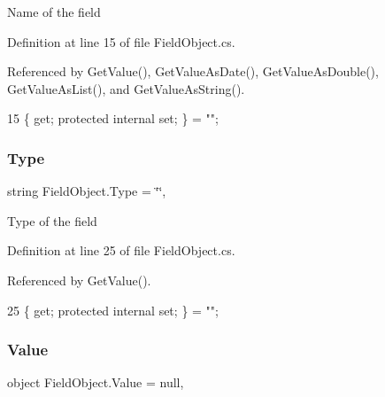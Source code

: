 Name of the field 



Definition at line 15 of file Field\+Object.\+cs.



Referenced by Get\+Value(), Get\+Value\+As\+Date(), Get\+Value\+As\+Double(), Get\+Value\+As\+List(), and Get\+Value\+As\+String().


\begin{DoxyCode}
15 \{ \textcolor{keyword}{get}; \textcolor{keyword}{protected} \textcolor{keyword}{internal} \textcolor{keyword}{set}; \} = \textcolor{stringliteral}{""};
\end{DoxyCode}
\mbox{\label{class_field_object_a370af2c26ae9c3e713b5d88b62a2a8f9}} 
\subsubsection{\texorpdfstring{Type}{Type}}
{\footnotesize\ttfamily string Field\+Object.\+Type = \char`\"{}\char`\"{}\hspace{0.3cm}{\ttfamily [get]}, {\ttfamily [set]}}



Type of the field 



Definition at line 25 of file Field\+Object.\+cs.



Referenced by Get\+Value().


\begin{DoxyCode}
25 \{ \textcolor{keyword}{get}; \textcolor{keyword}{protected} \textcolor{keyword}{internal} \textcolor{keyword}{set}; \} = \textcolor{stringliteral}{""};
\end{DoxyCode}
\mbox{\label{class_field_object_a9764fb1824cec95b82cd6ac0b4cd8919}} 
\subsubsection{\texorpdfstring{Value}{Value}}
{\footnotesize\ttfamily object Field\+Object.\+Value = null\hspace{0.3cm}{\ttfamily [get]}, {\ttfamily [set]}}



